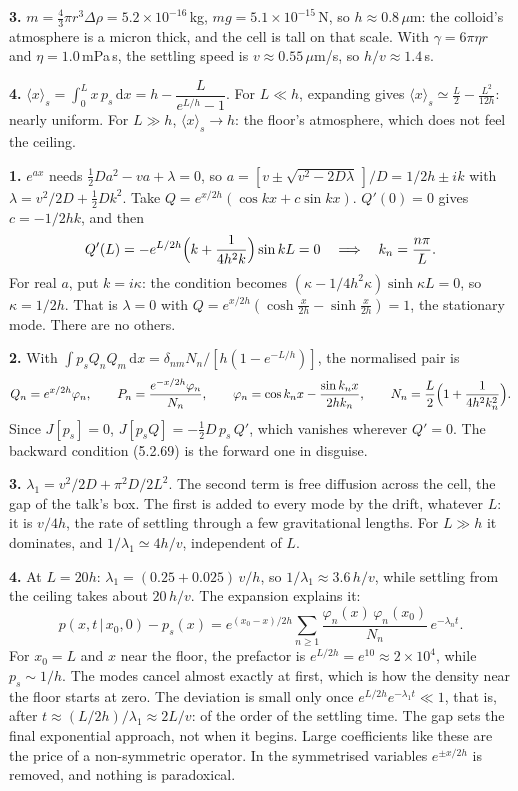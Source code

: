 \documentclass[11pt]{article}
\newcommand{\dd}{\mathrm{d}}
\newcommand{\avg}[1]{\langle #1\rangle}
\newcommand{\exsec}[1]{\par\vspace{6pt}{\sffamily\bfseries\large\color{PineGreen}#1}\par\vspace{-2pt}}
\begin{document}
\textbf{3.} $m=\frac43\pi r^3\Delta\rho=5.2\times10^{-16}$\,kg, $mg=5.1\times10^{-15}$\,N, so $h\approx0.8\,\mu$m:
the colloid's atmosphere is a micron thick, and the cell is tall on that scale. With $\gamma=6\pi\eta r$ and
$\eta=1.0$\,mPa\,s, the settling speed is $v\approx0.55\,\mu$m/s, so $h/v\approx1.4$\,s.

\textbf{4.} $\avg x_s=\int_0^Lx\,p_s\,\dd x=h-\dfrac L{e^{L/h}-1}$.
For $L\ll h$, expanding gives $\avg x_s\simeq\frac L2-\frac{L^2}{12h}$: nearly uniform. For $L\gg h$,
$\avg x_s\to h$: the floor's atmosphere, which does not feel the ceiling.

\exsec{(b) The closed cell: find the modes}
\textbf{1.} $e^{ax}$ needs $\frac12Da^2-va+\lambda=0$, so $a=[v\pm\sqrt{v^2-2D\lambda}\,]/D=1/2h\pm ik$ with
$\lambda=v^2/2D+\frac12Dk^2$. Take $Q=e^{x/2h}(\cos kx+c\sin kx)$. $Q'(0)=0$ gives $c=-1/2hk$, and then
\[ Q'(L)=-e^{L/2h}\Bigl(k+\frac1{4h^2k}\Bigr)\sin kL=0\quad\Longrightarrow\quad k_n=\frac{n\pi}L. \]
For real $a$, put $k=i\kappa$: the condition becomes $(\kappa-1/4h^2\kappa)\sinh\kappa L=0$, so $\kappa=1/2h$. That is
$\lambda=0$ with $Q=e^{x/2h}(\cosh\frac x{2h}-\sinh\frac x{2h})=1$, the stationary mode. There are no others.

\textbf{2.} With $\int p_sQ_nQ_m\,\dd x=\delta_{nm}N_n/[h(1-e^{-L/h})]$, the normalised pair is
\[ Q_n=e^{x/2h}\varphi_n,\qquad P_n=\frac{e^{-x/2h}\varphi_n}{N_n},\qquad
   \varphi_n=\cos k_nx-\frac{\sin k_nx}{2hk_n},\qquad N_n=\frac L2\Bigl(1+\frac1{4h^2k_n^2}\Bigr). \]
Since $J[p_s]=0$, $J[p_sQ]=-\frac12D\,p_s\,Q'$, which vanishes wherever $Q'=0$. The backward condition (5.2.69) is
the forward one in disguise.

\textbf{3.} $\lambda_1=v^2/2D+\pi^2D/2L^2$. The second term is free diffusion across the cell, the gap of the talk's
box. The first is added to every mode by the drift, whatever $L$: it is $v/4h$, the rate of settling through a few
gravitational lengths. For $L\gg h$ it dominates, and $1/\lambda_1\simeq4h/v$, independent of $L$.

\textbf{4.} At $L=20h$: $\lambda_1=(0.25+0.025)\,v/h$, so $1/\lambda_1\approx3.6\,h/v$, while settling from the
ceiling takes about $20\,h/v$. The expansion explains it:
\[ p(x,t\,|\,x_0,0)-p_s(x)=e^{(x_0-x)/2h}\sum_{n\ge1}\frac{\varphi_n(x)\,\varphi_n(x_0)}{N_n}\,e^{-\lambda_nt}. \]
For $x_0=L$ and $x$ near the floor, the prefactor is $e^{L/2h}=e^{10}\approx2\times10^4$, while $p_s\sim1/h$. The
modes cancel almost exactly at first, which is how the density near the floor starts at zero. The deviation is
small only once $e^{L/2h}e^{-\lambda_1t}\ll1$, that is, after $t\approx(L/2h)/\lambda_1\approx2L/v$: of the order
of the settling time. The gap sets the final exponential approach, not when it begins. Large coefficients like these
are the price of a non-symmetric operator. In the symmetrised variables $e^{\pm x/2h}$ is removed, and nothing is
paradoxical.
\end{document}
